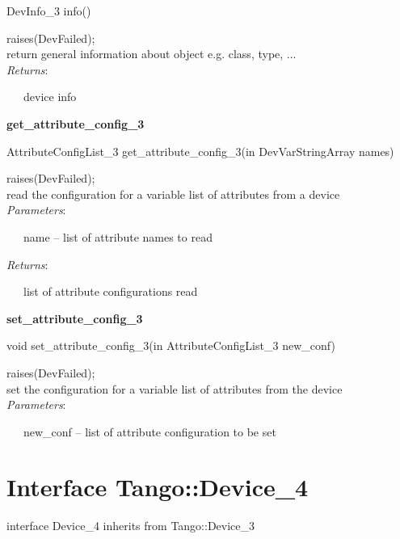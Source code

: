 DevInfo\_3 info()

raises(DevFailed);\\


return general information about object e.g. class, type, ...\\


\emph{Returns}:

~~~device info\\


\begin{flushleft}
\textbf{get\_attribute\_config\_3}
\par\end{flushleft}

AttributeConfigList\_3 get\_attribute\_config\_3(in DevVarStringArray
names)

raises(DevFailed);\\


read the configuration for a variable list of attributes from a device\\


\emph{Parameters}:

~~~name -- list of attribute names to read

\emph{Returns}:

~~~list of attribute configurations read\\


\begin{flushleft}
\textbf{set\_attribute\_config\_3}
\par\end{flushleft}

void set\_attribute\_config\_3(in AttributeConfigList\_3 new\_conf)

raises(DevFailed);\\


set the configuration for a variable list of attributes from the device\\


\emph{Parameters}:

~~~new\_conf -- list of attribute configuration to be set\\



\section{Interface Tango::Device\_4}

interface Device\_4 inherits from Tango::Device\_3\\


